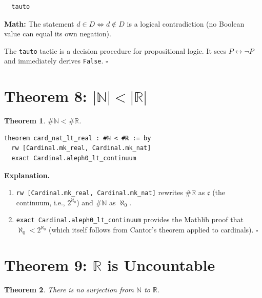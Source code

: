\documentclass[11pt]{article}
\theoremstyle{plain}
\newtheorem{theorem}{Theorem}[section]
\theoremstyle{definition}
\begin{document}
\begin{tcolorbox}[title=Line 10: Contradiction]
\begin{lstlisting}
  tauto
\end{lstlisting}
\textbf{Math:} The statement $d \in D \iff d \notin D$ is a logical
contradiction (no Boolean value can equal its own negation).

The \texttt{tauto} tactic is a decision procedure for propositional logic. It
sees $P \leftrightarrow \neg P$ and immediately derives \texttt{False}. $\square$
\end{tcolorbox}

\section{Theorem 8: $|\mathbb{N}| < |\mathbb{R}|$}

\begin{theorem}
$\#\mathbb{N} < \#\mathbb{R}$.
\end{theorem}

\begin{lstlisting}
theorem card_nat_lt_real : #ℕ < #ℝ := by
  rw [Cardinal.mk_real, Cardinal.mk_nat]
  exact Cardinal.aleph0_lt_continuum
\end{lstlisting}

\textbf{Explanation.}
\begin{enumerate}
  \item \texttt{rw [Cardinal.mk\_real, Cardinal.mk\_nat]} rewrites $\#\mathbb{R}$
        as $\mathfrak{c}$ (the continuum, i.e., $2^{\aleph_0}$) and $\#\mathbb{N}$
        as $\aleph_0$.
  \item \texttt{exact Cardinal.aleph0\_lt\_continuum} provides the Mathlib proof
        that $\aleph_0 < 2^{\aleph_0}$ (which itself follows from
        Cantor's theorem applied to cardinals). $\square$
\end{enumerate}

\section{Theorem 9: $\mathbb{R}$ is Uncountable}

\begin{theorem}
There is no surjection from $\mathbb{N}$ to $\mathbb{R}$.
\end{theorem}
\end{document}
